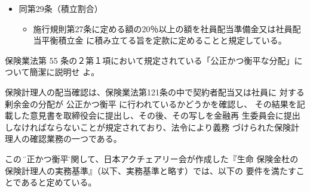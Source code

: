 \documentclass[report,gutter=10mm,fore-edge=10mm,uplatex,dvipdfmx]{jlreq}
\begin{document}
\begin{enumerate} [＊]
\begin{itemize}
\begin{itemize}
\item 社員に対する剰余金の分配をするために積み立てる準備金は、①社員配当準備金、および②
 社員配当平衡積立金とする。
\item 社員配当準備金は、社員に対する剰余金の分配をするための準備金として、貸借対照表上、
 負債の部に計上する。
\item 社員配当準備金の積立限度は次の合計額とする。
\begin{enumerate} [ ]
\item   ①積立配当の額
\item  ②未払配当の額（決算期においては翌朝配当所要額を含む。）
\item  ③全件消滅時配当の額
\item  ④その他①〜③に準ずるものとして保険料及び責任準備金の算出方法書に定める方法によ
  り計算した額
\end{enumerate}
\item 社員配当平衡積立金は、社員に対する剰余金の分配の額を安定させることを目的とする任意
 積立金として、貸借対照表上、資本の部に計上する。
\item 社員配当準備金または社員配当平衡積立金を取崩した場合は、取崩額の合計から社員に対す
 る剰余金の分配に充てた金額を控除した残額を社員配当準備金または社員配当平衡積立金
 に積み立てなければならない。ただし、損失のてん補、基金利息の支払い、損失てん補準備
 金の積立または基金償報積立金の積立に充てる場合を除く。
\end{itemize}
 \item 同第29条（積立割合）
\begin{itemize}
 \item 施行規則第27条に定める額の20％以上の額を社員配当準備金又は社員配当平衡積立金
 に積み立てる旨を定款に定めることと規定している。
\end{itemize}
\end{itemize}
\end{enumerate}

保険業法第 55 条の２第１項において規定されている「公正かつ衡平な分配」について簡潔に説明せ
よ。

保険計理人の配当確認は、保険業法第121条の中で契約者配当又は社員に
対する剰余金の分配が
公正かつ衡平
に行われているかどうかを確認し、
その結果を記載した意見書を取締役会に提出し、その後、その写しを金融再
生委員会に提出しなければならないことが規定されており、法令により義務
づけられた保険計理人の確認業務の一つである。

この \"公正かつ衡平\"
に関して、日本アクチェアリー会が作成した『生命
保険金杜の保険計理人の実務基準』（以下、実務基準と略す）では、以下の
要件を満たすことであると定めている。
\end{document}
